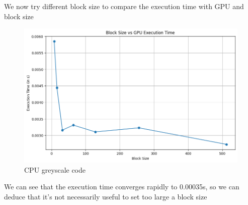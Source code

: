 \documentclass[a4paper]{article}
\begin{document}
We now try different block size to compare the execution time with GPU and block size

\begin{figure}[h]
    \centering
    \includegraphics[scale=0.5]{../src/block_size.png}
    \caption{CPU greyscale code}
    \end{figure}



We can see that the execution time converges rapidly to 0.00035s, 
so we can deduce that it's not necessarily useful to set too large a block size
\end{document}
